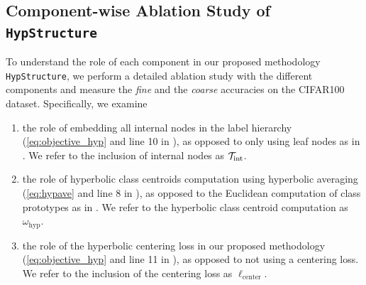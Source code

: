   \begin{table}[t]
  \caption{Linear classification accuracy  using \texttt{SupCon} \citep{2020supcon} as $\ell_\text{Flat}$.}
  \vspace{0.2cm}
    \centering
    \label{tab:linear_evals}
  \end{table}


\subsection{Component-wise Ablation Study of \texttt{HypStructure}}
\label{app:sec_ablations}


To understand the role of each component in our proposed methodology \texttt{HypStructure}, we perform a detailed ablation study with the different components and measure the \emph{fine} and the \emph{coarse} accuracies on the CIFAR100 dataset. Specifically, we examine

\begin{enumerate}
    \item the role of embedding all internal nodes in the label hierarchy (\cref{eq:objective_hyp} and line 10 in ), as opposed to only using leaf nodes as in \citet{zeng2022learning}. We refer to the inclusion of internal nodes as ${\mathcal{T}}_{\text{int}}$.
    
    \item the role of hyperbolic class centroids computation using hyperbolic averaging (\cref{eq:hypave} and line 8 in ), as opposed to the Euclidean computation of class prototypes as in \citet{zeng2022learning}. We refer to the hyperbolic class centroid computation as $\omega_{\text{hyp}}$.

    \item the role of the hyperbolic centering loss in our proposed methodology (\cref{eq:objective_hyp} and line 11 in ), as opposed to not using a centering loss. We refer to the inclusion of the centering loss as $\ell_\text{center}$.
\end{enumerate}



